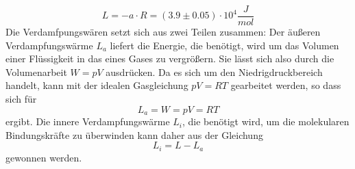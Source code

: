   \begin{equation*}
    L= - a \cdot R = (3.9 \pm 0.05) \cdot 10^4 \dfrac{J}{mol}
  \end{equation*}
  Die Verdamfpungswären setzt sich aus zwei Teilen zusammen: Der äußeren Verdampfungswärme $L_a$
  liefert die Energie, die benötigt, wird um das Volumen einer Flüssigkeit in das eines 
  Gases zu vergrößern. Sie lässt sich also durch die Volumenarbeit $W = pV$ ausdrücken. Da es sich um 
  den Niedrigdruckbereich handelt, kann mit der idealen Gasgleichung $pV = RT$ gearbeitet 
  werden, so dass sich für 
  \begin{equation*}
  L_a = W = pV = RT
  \end{equation*}
  ergibt. Die innere Verdampfungswärme $L_i$, die benötigt wird, um die molekularen Bindungskräfte
  zu überwinden kann daher aus der Gleichung
  \begin{equation*}
  L_i = L - L_a
  \end{equation*}
  gewonnen werden.

